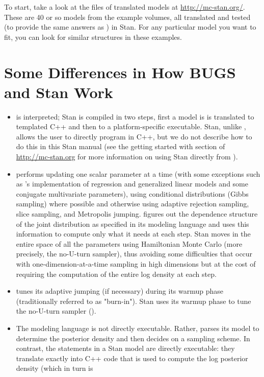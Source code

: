 To start, take a look at the files of translated \BUGS models at
\url{http://mc-stan.org/}.  These are 40 or so models from the \BUGS
example volumes, all translated and tested (to provide the same
answers as \BUGS) in Stan.  For any particular model you want to fit,
you can look for similar structures in these examples.

\section{Some Differences in How BUGS and Stan Work}

\begin{itemize}
\item \BUGS is interpreted; Stan is compiled in two steps, first a
  model is is translated to templated C++ and then to a
  platform-specific executable.  Stan, unlike \BUGS, allows the user
  to directly program in C++, but we do not describe how to do this in
  this Stan manual (see the getting started with \Cpp section of
  \url{http://mc-stan.org} for more information on using Stan directly
  from \Cpp). 
\item \BUGS performs \MCMC updating one scalar parameter at a time
  (with some exceptions such as \JAGS's implementation of regression
  and generalized linear models and some conjugate multivariate
  parameters), using conditional distributions (Gibbs sampling) where
  possible and otherwise using adaptive rejection sampling, slice
  sampling, and Metropolis jumping.  \BUGS figures out the dependence
  structure of the joint distribution as specified in its modeling
  language and uses this information to compute only what it needs at
  each step.  Stan moves in the entire space of all the parameters
  using Hamiltonian Monte Carlo (more precisely, the no-U-turn
  sampler), thus avoiding some difficulties that occur with
  one-dimension-at-a-time sampling in high dimensions but at the cost
  of requiring the computation of the entire log density at each step.
\item \BUGS tunes its adaptive jumping (if necessary) during its
  warmup phase (traditionally referred to as "burn-in").  Stan uses
  its warmup phase to tune the no-U-turn sampler (\NUTS).
\item The \BUGS modeling language is not directly executable.  Rather,
  \BUGS parses its model to determine the posterior density and then
  decides on a sampling scheme.  In contrast, the statements in a Stan
  model are directly executable: they translate exactly into C++ code
  that is used to compute the log posterior density (which in turn is

\end{itemize}
